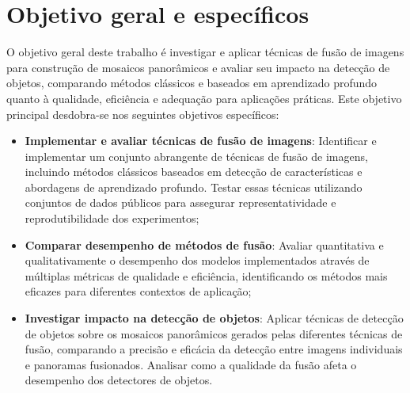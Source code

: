 
\section{Objetivo geral e específicos}\label{sec:objetivos}

O objetivo geral deste trabalho é investigar e aplicar técnicas de fusão de imagens para construção de mosaicos panorâmicos e avaliar seu impacto na detecção de objetos, comparando métodos clássicos e baseados em aprendizado profundo quanto à qualidade, eficiência e adequação para aplicações práticas. Este objetivo principal desdobra-se nos seguintes objetivos específicos:

\begin{itemize}
    \item \textbf{Implementar e avaliar técnicas de fusão de imagens}: Identificar e implementar um conjunto abrangente de técnicas de fusão de imagens, incluindo métodos clássicos baseados em detecção de características e abordagens de aprendizado profundo. Testar essas técnicas utilizando conjuntos de dados públicos para assegurar representatividade e reprodutibilidade dos experimentos;

    \item \textbf{Comparar desempenho de métodos de fusão}: Avaliar quantitativa e qualitativamente o desempenho dos modelos implementados através de múltiplas métricas de qualidade e eficiência, identificando os métodos mais eficazes para diferentes contextos de aplicação;

    \item \textbf{Investigar impacto na detecção de objetos}: Aplicar técnicas de detecção de objetos sobre os mosaicos panorâmicos gerados pelas diferentes técnicas de fusão, comparando a precisão e eficácia da detecção entre imagens individuais e panoramas fusionados. Analisar como a qualidade da fusão afeta o desempenho dos detectores de objetos.
\end{itemize}



